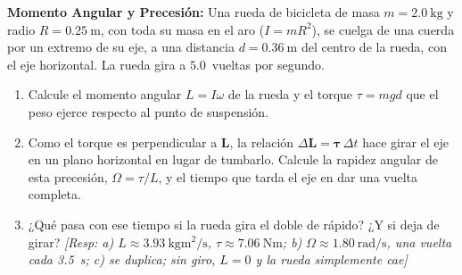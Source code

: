     \item \textbf{Momento Angular y Precesión:} Una rueda de bicicleta de
    masa $m = \SI{2.0}{\kilo\gram}$ y radio $R = \SI{0.25}{\meter}$, con
    toda su masa en el aro ($I = mR^{2}$), se cuelga de una cuerda por un
    extremo de su eje, a una distancia $d = \SI{0.36}{\meter}$ del centro de
    la rueda, con el eje horizontal. La rueda gira a
    $\num{5.0}$~vueltas por segundo.
    \begin{enumerate}
        \item Calcule el momento angular $L = I\omega$ de la rueda y el torque
        $\tau = mgd$ que el peso ejerce respecto al punto de suspensión.
        \item Como el torque es perpendicular a $\boldsymbol{L}$, la relación
        $\Delta\boldsymbol{L} = \boldsymbol{\tau}\,\Delta t$ hace girar el eje
        en un plano horizontal en lugar de tumbarlo. Calcule la rapidez
        angular de esta precesión, $\Omega = \tau/L$, y el tiempo que tarda el
        eje en dar una vuelta completa.
        \item ¿Qué pasa con ese tiempo si la rueda gira el doble de rápido?
        ¿Y si deja de girar? \textit{[Resp: a)
        $L \approx \SI{3.93}{\kilo\gram\meter\squared\per\second}$,
        $\tau \approx \SI{7.06}{\newton\meter}$; b)
        $\Omega \approx \SI{1.80}{\radian\per\second}$, una vuelta cada
        \SI{3.5}{\second}; c) se duplica; sin giro, $L = 0$ y la rueda
        simplemente cae]}
    \end{enumerate}
